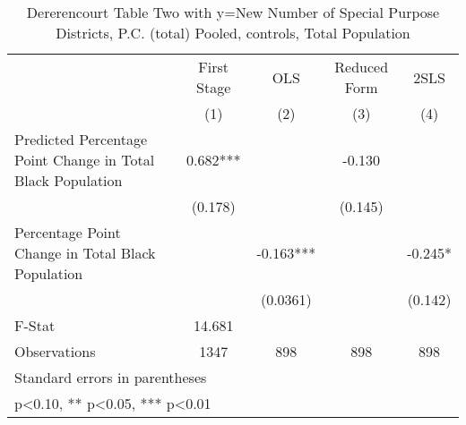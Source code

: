 \begin{table}[htbp]\centering
\def\sym#1{\ifmmode^{#1}\else\(^{#1}\)\fi}
\caption{Dererencourt Table Two with y=New Number of Special Purpose Districts, P.C. (total)  Pooled,  controls, Total Population}
\begin{tabular}{l*{4}{c}}
\toprule
                    & First Stage   &         OLS   &Reduced Form   &        2SLS   \\
                    &\multicolumn{1}{c}{(1)}   &\multicolumn{1}{c}{(2)}   &\multicolumn{1}{c}{(3)}   &\multicolumn{1}{c}{(4)}   \\
\midrule
Predicted Percentage Point Change in Total Black Population&       0.682***&               &      -0.130   &               \\
                    &     (0.178)   &               &     (0.145)   &               \\
\addlinespace
Percentage Point Change in Total Black Population&               &      -0.163***&               &      -0.245*  \\
                    &               &    (0.0361)   &               &     (0.142)   \\
\midrule
F-Stat              &      14.681   &               &               &               \\
Observations        &        1347   &         898   &         898   &         898   \\
\bottomrule
\multicolumn{5}{l}{\footnotesize Standard errors in parentheses}\\
\multicolumn{5}{l}{\footnotesize * p<0.10, ** p<0.05, *** p<0.01}\\
\end{tabular}
\end{table}

